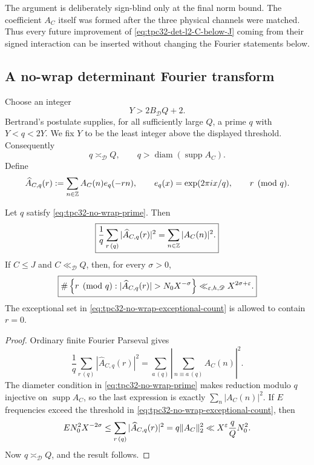 The argument is deliberately sign-blind only at the final norm bound.
The coefficient $A_C$ itself was formed after the three physical
channels were matched.  Thus every future improvement of
\eqref{eq:tpc32-det-l2-C-below-J} coming from their signed interaction
can be inserted without changing the Fourier statements below.

\subsection{A no-wrap determinant Fourier transform}

Choose an integer
\[
 Y>2B_{\mathscr D}Q+2.
\]
Bertrand's postulate supplies, for all sufficiently large $Q$, a prime
$q$ with $Y<q<2Y$.  We fix $Y$ to be the least integer above the
displayed threshold.  Consequently
\begin{equation}
 q\asymp_{\mathscr D}Q,
 \qquad
 q>\operatorname{diam}(\operatorname{supp}A_C).
 \label{eq:tpc32-no-wrap-prime}
\end{equation}
Define
\begin{equation}
 \widehat A_{C,q}(r)
 :=\sum_{n\in\mathbb Z}A_C(n)e_q(-rn),
 \qquad
 e_q(x)=\exp(2\pi ix/q),
 \qquad r\pmod q.
 \label{eq:tpc32-no-wrap-DFT}
\end{equation}

\begin{theorem}
\label{thm:tpc32-no-wrap-parseval}
Let $q$ satisfy \eqref{eq:tpc32-no-wrap-prime}.  Then
\begin{equation}
 \boxed{
 \frac1q\sum_{r\, (q)}|\widehat A_{C,q}(r)|^2
 =\sum_{n\in\mathbb Z}|A_C(n)|^2.}
 \label{eq:tpc32-no-wrap-parseval}
\end{equation}
If $C\le J$ and $C\ll_{\mathscr D}Q$, then, for every $\sigma>0$,
\begin{equation}
 \boxed{
 \#\left\{r\pmod q:
 |\widehat A_{C,q}(r)|>N_0X^{-\sigma}\right\}
 \ll_{\eps,h,\mathscr D}X^{2\sigma+\eps}.}
 \label{eq:tpc32-no-wrap-exceptional-count}
\end{equation}
The exceptional set in \eqref{eq:tpc32-no-wrap-exceptional-count} is
allowed to contain $r=0$.
\end{theorem}

\begin{proof}
Ordinary finite Fourier Parseval gives
\[
 \frac1q\sum_{r\, (q)}|\widehat A_{C,q}(r)|^2
 =\sum_{a\, (q)}
   \left|\sum_{n\equiv a\, (q)}A_C(n)\right|^2.
\]
The diameter condition in \eqref{eq:tpc32-no-wrap-prime} makes reduction
modulo $q$ injective on $\operatorname{supp}A_C$, so the last expression
is exactly $\sum_n|A_C(n)|^2$.  If $E$ frequencies exceed the threshold
in \eqref{eq:tpc32-no-wrap-exceptional-count}, then
\[
 E N_0^2X^{-2\sigma}
 \le\sum_{r\, (q)}|\widehat A_{C,q}(r)|^2
 =q\|A_C\|_2^2
 \ll X^\varepsilon\frac qQ N_0^2.
\]
Now $q\asymp_{\mathscr D}Q$, and the result follows.
\end{proof}

